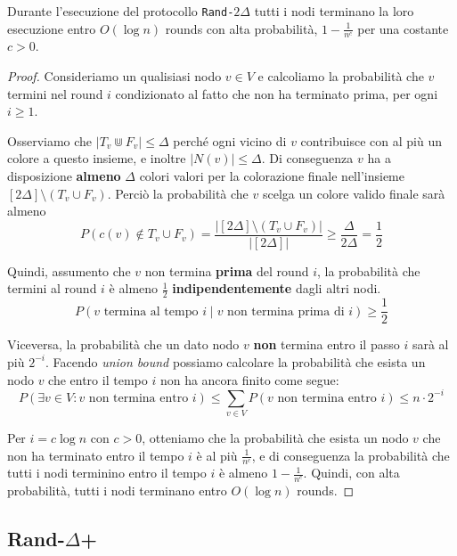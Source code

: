 \begin{teorema}
    Durante l'esecuzione del protocollo \texttt{Rand-$2\Delta$} tutti i nodi terminano la loro esecuzione entro $O(\log n)$ rounds con alta probabilità, $1 - \frac{1}{n^c}$ per una costante $c > 0$.
    \begin{proof}
        Consideriamo un qualisiasi nodo $v \in V$ e calcoliamo la probabilità che $v$ termini nel round $i$ condizionato al fatto che non ha terminato prima, per ogni $i \geq 1$.
        
        Osserviamo che $|T_v \Cup F_v| \leq \Delta$ perché ogni vicino di $v$ contribuisce con al più un colore a questo insieme, e inoltre $|N(v)| \leq \Delta$. Di conseguenza $v$ ha a disposizione \textbf{almeno} $\Delta$ colori valori per la colorazione finale nell'insieme $[2\Delta] \setminus (T_v \cup F_v)$. Perciò la probabilità che $v$ scelga un colore valido finale sarà almeno
        \[
            P(c(v) \notin T_v \cup F_v) = \frac{|[2\Delta] \setminus (T_v \cup F_v)|}{|[2\Delta]|} \geq \frac{\Delta}{2\Delta} = \frac{1}{2}
        \]

        Quindi, assumento che $v$ non termina \textbf{prima} del round $i$, la probabilità che termini al round $i$ è almeno $\frac{1}{2}$ \textbf{indipendentemente} dagli altri nodi.
        \[
            P(v \text{ termina al tempo } i \mid v \text{ non termina prima di } i) \geq \frac{1}{2}
        \]

        Viceversa, la probabilità che un dato nodo $v$ \textbf{non} termina entro il passo $i$ sarà al più $2^{-i}$. Facendo \textit{union bound} possiamo calcolare la probabilità che esista un nodo $v$ che entro il tempo $i$ non ha ancora finito come segue:
        \[
            P(\exists v \in V: v \text{ non termina entro } i) \leq \sum_{v \in V} P(v \text{ non termina entro }i) \leq n \cdot 2^{-i}
        \]

        Per $i = c \log n$ con $c > 0$, otteniamo che la probabilità che esista un nodo $v$ che non ha terminato entro il tempo $i$ è al più $\frac{1}{n^c}$, e di conseguenza la probabilità che tutti i nodi terminino entro il tempo $i$ è almeno $1 - \frac{1}{n^c}$. Quindi, con alta probabilità, tutti i nodi terminano entro $O(\log n)$ rounds.
    \end{proof}
\end{teorema}

\subsection{Rand-$\Delta$+}


